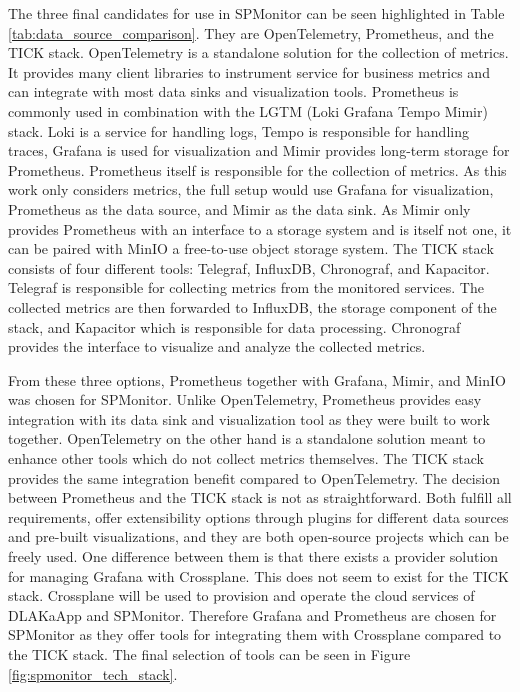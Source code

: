 The three final candidates for use in SPMonitor can be seen highlighted in Table \ref{tab:data_source_comparison}.
They are OpenTelemetry, Prometheus, and the TICK stack.
OpenTelemetry is a standalone solution for the collection of metrics. 
It provides many client libraries to instrument service for business metrics and can integrate
with most data sinks and visualization tools.
Prometheus is commonly used in combination with the LGTM (Loki Grafana Tempo Mimir) stack.
Loki is a service for handling logs, Tempo is responsible for handling traces, Grafana is used for visualization and Mimir provides
long-term storage for Prometheus. Prometheus itself is responsible for the collection of metrics.
As this work only considers metrics, the full setup would use Grafana for visualization, Prometheus as the data source, and Mimir
as the data sink. As Mimir only provides Prometheus with an interface to a storage system and is itself not one, it can be paired with MinIO
a free-to-use object storage system.
The TICK stack consists of four different tools: Telegraf, InfluxDB, Chronograf, and Kapacitor.
Telegraf is responsible for collecting metrics from the monitored services. The collected metrics are then forwarded
to InfluxDB, the storage component of the stack, and Kapacitor which is responsible for data processing.
Chronograf provides the interface to visualize and analyze the collected metrics.

From these three options, Prometheus together with Grafana, Mimir, and MinIO was chosen for SPMonitor.
Unlike OpenTelemetry, Prometheus provides easy integration with its data sink and visualization tool as
they were built to work together. OpenTelemetry on the other hand is a standalone solution meant to enhance
other tools which do not collect metrics themselves. The TICK stack provides the same integration benefit compared
to OpenTelemetry. The decision between Prometheus and the TICK stack is not as straightforward.
Both fulfill all requirements, offer extensibility options through plugins for different data sources
and pre-built visualizations, and they are both open-source projects which can be freely used.
One difference between them is that there exists a provider solution for managing Grafana with Crossplane.
This does not seem to exist for the TICK stack. Crossplane will be used to provision and operate the cloud
services of DLAKaApp and SPMonitor. Therefore Grafana and Prometheus are chosen for SPMonitor as they offer tools
for integrating them with Crossplane compared to the TICK stack. The final selection of tools can be seen in Figure \ref{fig:spmonitor_tech_stack}.

